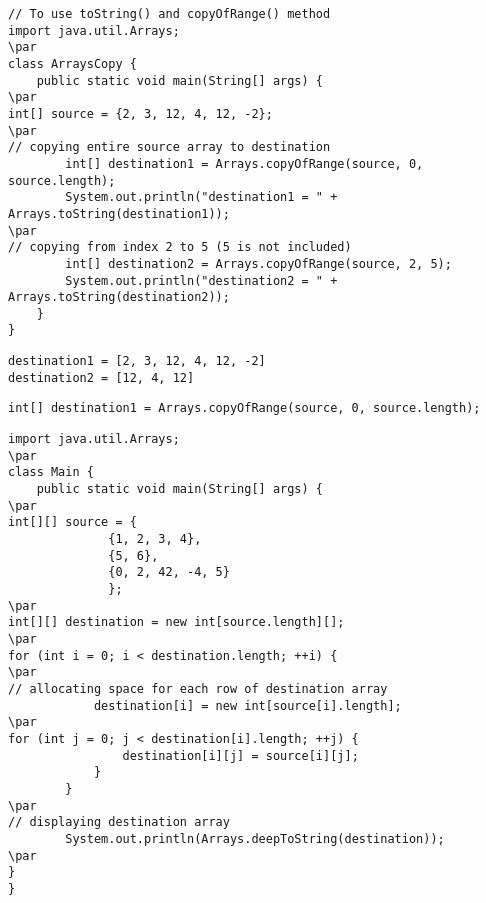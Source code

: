 \documentclass{book}
\def\lthtmlcheckvsize{\ifdim\ht\sizebox<\vsize 
  \ifdim\wd\sizebox<\hsize\expandafter\hfill\fi \expandafter\vfill
  \else\expandafter\vss\fi}%
\begin{document}
{\newpage\clearpage
{}%
\begin{lstlisting}
// To use toString() and copyOfRange() method
import java.util.Arrays;
\par
class ArraysCopy {
    public static void main(String[] args) {
\par
int[] source = {2, 3, 12, 4, 12, -2};
\par
// copying entire source array to destination
        int[] destination1 = Arrays.copyOfRange(source, 0, source.length);      
        System.out.println("destination1 = " + Arrays.toString(destination1)); 
\par
// copying from index 2 to 5 (5 is not included) 
        int[] destination2 = Arrays.copyOfRange(source, 2, 5); 
        System.out.println("destination2 = " + Arrays.toString(destination2));   
    }
}
\end{lstlisting}%
\lthtmlfigureZ
\lthtmlcheckvsize\clearpage}

{\newpage\clearpage
{}%
\begin{lstlisting}
destination1 = [2, 3, 12, 4, 12, -2]
destination2 = [12, 4, 12]
\end{lstlisting}%
\lthtmlfigureZ
\lthtmlcheckvsize\clearpage}

{\newpage\clearpage
{}%
\begin{lstlisting}
int[] destination1 = Arrays.copyOfRange(source, 0, source.length);
\end{lstlisting}%
\lthtmlfigureZ
\lthtmlcheckvsize\clearpage}

{\newpage\clearpage
{}%
\begin{lstlisting}
import java.util.Arrays;
\par
class Main {
    public static void main(String[] args) {
\par
int[][] source = {
              {1, 2, 3, 4}, 
              {5, 6},
              {0, 2, 42, -4, 5}
              };
\par
int[][] destination = new int[source.length][];
\par
for (int i = 0; i < destination.length; ++i) {
\par
// allocating space for each row of destination array
            destination[i] = new int[source[i].length];
\par
for (int j = 0; j < destination[i].length; ++j) {
                destination[i][j] = source[i][j];
            }
        }
\par
// displaying destination array
        System.out.println(Arrays.deepToString(destination));  
\par
}
}
\end{lstlisting}%
\lthtmlfigureZ
\lthtmlcheckvsize\clearpage}
\end{document}
